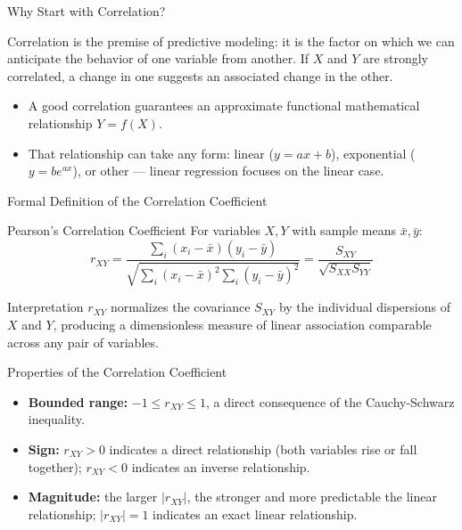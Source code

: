 \documentclass[10pt, aspectratio=169]{beamer}
\begin{document}
\begin{frame}{Why Start with Correlation?}
  \footnotesize
  \begin{motivacion}
    Correlation is the premise of predictive modeling: it is the factor on which we can anticipate the behavior of one variable from another. If $X$ and $Y$ are strongly correlated, a change in one suggests an associated change in the other.
  \end{motivacion}

  \vspace{0.15cm}
  \pause
  \begin{itemize}\itemsep=0.1cm
    \item A good correlation guarantees an approximate functional mathematical relationship $Y=f(X)$. \pause
    \item That relationship can take any form: linear ($y=ax+b$), exponential ($y=be^{ax}$), or other --- linear regression focuses on the linear case.
  \end{itemize}
\end{frame}

\begin{frame}{Formal Definition of the Correlation Coefficient}
  \footnotesize
  \begin{block}{Pearson's Correlation Coefficient}
    For variables $X,Y$ with sample means $\bar x,\bar y$:
    $$r_{XY}=\frac{\sum_i(x_i-\bar x)(y_i-\bar y)}{\sqrt{\sum_i(x_i-\bar x)^2\sum_i(y_i-\bar y)^2}}=\frac{S_{XY}}{\sqrt{S_{XX}S_{YY}}}$$
  \end{block}
  \pause

  \vspace{0.1cm}
  \begin{alertblock}{Interpretation}
    $r_{XY}$ normalizes the covariance $S_{XY}$ by the individual dispersions of $X$ and $Y$, producing a dimensionless measure of linear association comparable across any pair of variables.
  \end{alertblock}
\end{frame}

\begin{frame}{Properties of the Correlation Coefficient}
  \footnotesize
  \begin{itemize}\itemsep=0.12cm
    \item \textbf{Bounded range:} $-1\leq r_{XY}\leq1$, a direct consequence of the Cauchy-Schwarz inequality. \pause
    \item \textbf{Sign:} $r_{XY}>0$ indicates a direct relationship (both variables rise or fall together); $r_{XY}<0$ indicates an inverse relationship. \pause
    \item \textbf{Magnitude:} the larger $|r_{XY}|$, the stronger and more predictable the linear relationship; $|r_{XY}|=1$ indicates an exact linear relationship.
  \end{itemize}
\end{frame}
\end{document}
